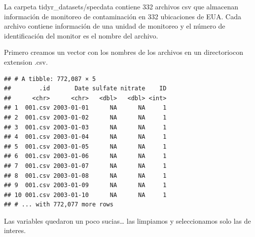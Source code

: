 \documentclass[]{article}
\newenvironment{Shaded}{\begin{snugshade}}{\end{snugshade}}
\newcommand{\KeywordTok}[1]{\textcolor[rgb]{0.13,0.29,0.53}{\textbf{{#1}}}}
\newcommand{\DataTypeTok}[1]{\textcolor[rgb]{0.13,0.29,0.53}{{#1}}}
\newcommand{\CharTok}[1]{\textcolor[rgb]{0.31,0.60,0.02}{{#1}}}
\newcommand{\StringTok}[1]{\textcolor[rgb]{0.31,0.60,0.02}{{#1}}}
\newcommand{\OtherTok}[1]{\textcolor[rgb]{0.56,0.35,0.01}{{#1}}}
\newcommand{\NormalTok}[1]{{#1}}
\begin{document}
La carpeta tidyr\_datasets/specdata contiene 332 archivos csv que
almacenan información de monitoreo de contaminación en 332 ubicaciones
de EUA. Cada archivo contiene información de una unidad de monitoreo y
el número de identificación del monitor es el nombre del archivo.

Primero creamos un vector con los nombres de los archivos en un
directoriocon extension .csv.

\begin{Shaded}
\end{Shaded}

\begin{verbatim}
## # A tibble: 772,087 × 5
##        .id       Date sulfate nitrate    ID
##      <chr>      <chr>   <dbl>   <dbl> <int>
## 1  001.csv 2003-01-01      NA      NA     1
## 2  001.csv 2003-01-02      NA      NA     1
## 3  001.csv 2003-01-03      NA      NA     1
## 4  001.csv 2003-01-04      NA      NA     1
## 5  001.csv 2003-01-05      NA      NA     1
## 6  001.csv 2003-01-06      NA      NA     1
## 7  001.csv 2003-01-07      NA      NA     1
## 8  001.csv 2003-01-08      NA      NA     1
## 9  001.csv 2003-01-09      NA      NA     1
## 10 001.csv 2003-01-10      NA      NA     1
## # ... with 772,077 more rows
\end{verbatim}

Las variables quedaron un poco sucias\ldots{} las limpiamos y
seleccionamos solo las de interes.

\begin{Shaded}
\end{Shaded}
\end{document}
